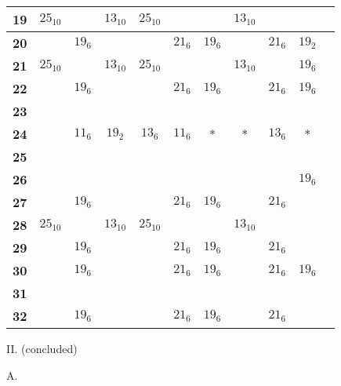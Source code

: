 \documentclass[oneside]{article}
\begin{document}
\begin{center}
\begin{tabular}{|r|c|c|c|c|c|c|c|c|c|c|}
\textbf{19}&$25_{10}$&      &$13_{10}$&$25_{10}$&      &      &$13_{10}$&      &         \\ \hline
\textbf{20}&         &$19_6$&         &         &$21_6$&$19_6$&         &$21_6$&$19_2$   \\ \hline
\textbf{21}&$25_{10}$&      &$13_{10}$&$25_{10}$&      &      &$13_{10}$&      &$19_6$   \\ \hline
\textbf{22}&         &$19_6$&         &         &$21_6$&$19_6$&         &$21_6$&$19_6$   \\ \hline
\textbf{23}&         &      &         &         &      &      &         &      &         \\ \hline
\textbf{24}&         &$11_6$&$19_2$   &$13_6$   &$11_6$&*     &*        &$13_6$&*        \\ \hline
\textbf{25}&         &      &         &         &      &      &         &      &         \\ \hline
\textbf{26}&         &      &         &         &      &      &         &      &$19_6$   \\ \hline
\textbf{27}&         &$19_6$&         &         &$21_6$&$19_6$&         &$21_6$&         \\ \hline
\textbf{28}&$25_{10}$&      &$13_{10}$&$25_10$  &      &      &$13_{10}$&      &         \\ \hline
\textbf{29}&         &$19_6$&         &         &$21_6$&$19_6$&         &$21_6$&         \\ \hline
\textbf{30}&         &$19_6$&         &         &$21_6$&$19_6$&         &$21_6$&$19_6$   \\ \hline
\textbf{31}&         &      &         &         &      &      &         &      &         \\ \hline
\textbf{32}&         &$19_6$&         &         &$21_6$&$19_6$&         &$21_6$&         \\ \hline
\end{tabular}

\newpage
\large II. \normalsize (concluded)

\smallskip
A.


\end{center}
\end{document}
